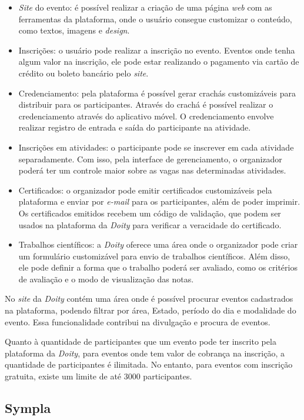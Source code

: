 \begin{itemize}
    \item \textit{Site} do evento: é possível realizar a criação de uma página \textit{web} com as ferramentas da plataforma, onde o usuário consegue customizar o conteúdo, como textos, imagens e \textit{design}.
    \item Inscrições: o usuário pode realizar a inscrição no evento. Eventos onde tenha algum valor na inscrição, ele pode estar realizando o pagamento via cartão de crédito ou boleto bancário pelo \textit{site}.
    \item Credenciamento: pela plataforma é possível gerar crachás customizáveis para distribuir para os participantes. Através do crachá é possível realizar o credenciamento através do aplicativo móvel. O credenciamento envolve realizar registro de entrada e saída do participante na atividade.
    \item Inscrições em atividades: o participante pode se inscrever em cada atividade separadamente. Com isso, pela interface de gerenciamento, o organizador poderá ter um controle maior sobre as vagas nas determinadas atividades.
    \item Certificados: o organizador pode emitir certificados customizáveis pela plataforma e enviar por \textit{e-mail} para os participantes, além de poder imprimir. Os certificados emitidos recebem um código de validação, que podem ser usados na plataforma da \textit{Doity} para verificar a veracidade do certificado.
    \item Trabalhos científicos: a \textit{Doity} oferece uma área onde o organizador pode criar um formulário customizável para envio de trabalhos científicos. Além disso, ele pode definir a forma que o trabalho poderá ser avaliado, como os critérios de avaliação e o modo de visualização das notas.
\end{itemize}

No \textit{site} da \textit{Doity} contém uma área onde é possível procurar eventos cadastrados na plataforma, podendo filtrar por área, Estado, período do dia e modalidade do evento. Essa funcionalidade contribui na divulgação e procura de eventos.

Quanto à quantidade de participantes que um evento pode ter inscrito pela plataforma da \textit{Doity}, para eventos onde tem valor de cobrança na inscrição, a quantidade de participantes é ilimitada. No entanto, para eventos com inscrição gratuita, existe um limite de até 3000 participantes. 

\subsection{Sympla}

